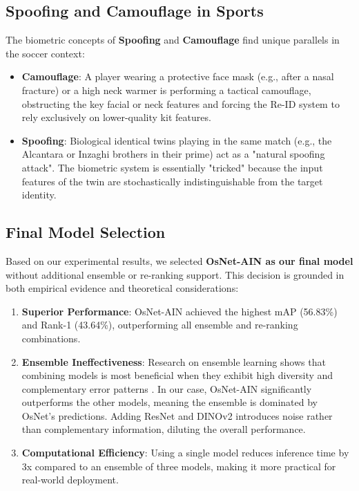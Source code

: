\documentclass[10pt,twocolumn,letterpaper]{article}
\begin{document}
\subsection{Spoofing and Camouflage in Sports}
The biometric concepts of \textbf{Spoofing} and \textbf{Camouflage} find unique parallels in the soccer context:
\begin{itemize}
    \item \textbf{Camouflage}: A player wearing a protective face mask (e.g., after a nasal fracture) or a high neck warmer is performing a tactical camouflage, obstructing the key facial or neck features and forcing the Re-ID system to rely exclusively on lower-quality kit features.
    \item \textbf{Spoofing}: Biological identical twins playing in the same match (e.g., the Alcantara or Inzaghi brothers in their prime) act as a "natural spoofing attack". The biometric system is essentially "tricked" because the input features of the twin are stochastically indistinguishable from the target identity.
\end{itemize}

\subsection{Final Model Selection}

Based on our experimental results, we selected \textbf{OsNet-AIN as our final model} without additional ensemble or re-ranking support. This decision is grounded in both empirical evidence and theoretical considerations:

\begin{enumerate}
    \item \textbf{Superior Performance}: OsNet-AIN achieved the highest mAP (56.83\%) and Rank-1 (43.64\%), outperforming all ensemble and re-ranking combinations.
    
    \item \textbf{Ensemble Ineffectiveness}: Research on ensemble learning shows that combining models is most beneficial when they exhibit high diversity and complementary error patterns \cite{ensemble_diversity}. In our case, OsNet-AIN significantly outperforms the other models, meaning the ensemble is dominated by OsNet's predictions. Adding ResNet and DINOv2 introduces noise rather than complementary information, diluting the overall performance.
    
    \item \textbf{Computational Efficiency}: Using a single model reduces inference time by 3x compared to an ensemble of three models, making it more practical for real-world deployment.
\end{enumerate}
\end{document}
